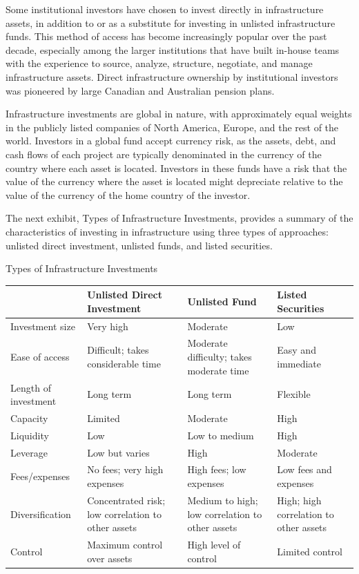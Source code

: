 \documentclass[11pt]{article}
\begin{document}
Some institutional investors have chosen to invest directly in infrastructure assets, in addition to or as a substitute for investing in unlisted infrastructure funds. This method of access has become increasingly popular over the past decade, especially among the larger institutions that have built in-house teams with the experience to source, analyze, structure, negotiate, and manage infrastructure assets. Direct infrastructure ownership by institutional investors was pioneered by large Canadian and Australian pension plans.

Infrastructure investments are global in nature, with approximately equal weights in the publicly listed companies of North America, Europe, and the rest of the world. Investors in a global fund accept currency risk, as the assets, debt, and cash flows of each project are typically denominated in the currency of the country where each asset is located. Investors in these funds have a risk that the value of the currency where the asset is located might depreciate relative to the value of the currency of the home country of the investor.

The next exhibit, Types of Infrastructure Investments, provides a summary of the characteristics of investing in infrastructure using three types of approaches: unlisted direct investment, unlisted funds, and listed securities.

Types of Infrastructure Investments

\begin{center}
\begin{tabular}{|llll|}
\hline
 & Unlisted Direct Investment & Unlisted Fund & Listed Securities \\
\hline
Investment size & Very high & Moderate & Low \\
Ease of access & Difficult; takes considerable time & Moderate difficulty; takes moderate time & Easy and immediate \\
Length of investment & Long term & Long term & Flexible \\
Capacity & Limited & Moderate & High \\
Liquidity & Low & Low to medium & High \\
Leverage & Low but varies & High & Moderate \\
Fees/expenses & No fees; very high expenses & High fees; low expenses & Low fees and expenses \\
Diversification & Concentrated risk; low correlation to other assets & Medium to high; low correlation to other assets & High; high correlation to other assets \\
Control & Maximum control over assets & High level of control & Limited control \\
\end{tabular}
\end{center}
\end{document}
